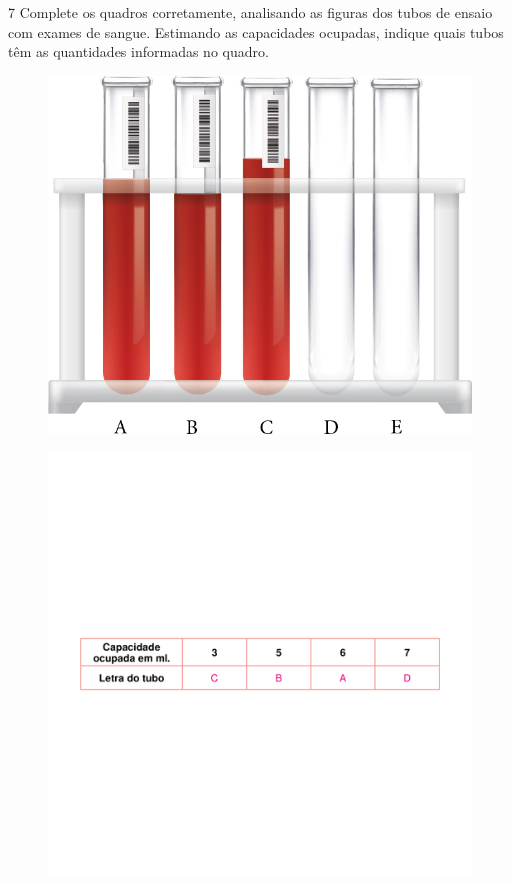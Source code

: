 
\num{7} Complete os quadros corretamente, analisando as figuras dos tubos de
ensaio com exames de sangue. Estimando as capacidades ocupadas, indique
quais tubos têm as quantidades informadas no quadro.


\begin{figure}[H]
\centering\includegraphics[width=.4\textwidth]{./media/image36.png}
\end{figure}

\begin{figure}[H]
\includegraphics[width=\textwidth]{./media/image37_prof.png}
\end{figure}

